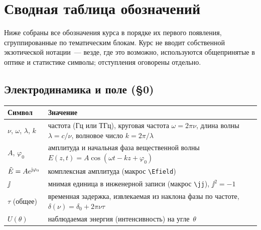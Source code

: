 %
\section{Сводная таблица обозначений}
\label{sec:notation}

Ниже собраны все обозначения курса в порядке их первого появления, сгруппированные по
тематическим блокам. Курс не вводит собственной экзотической нотации~--- везде, где это возможно,
используются общепринятые в оптике и статистике символы; отступления оговорены отдельно.

\subsection*{Электродинамика и поле (§0)}
\begin{center}
\footnotesize
\setlength{\tabcolsep}{6pt}
\begin{tabular}{@{}p{0.16\linewidth}p{0.84\linewidth}@{}}
\toprule
\textbf{Символ} & \textbf{Значение} \\
\midrule
$\nu$, $\omega$, $\lambda$, $k$ & частота (Гц или ТГц), круговая частота $\omega=2\pi\nu$, длина
волны $\lambda=c/\nu$, волновое число $k=2\pi/\lambda$ \\
$A$, $\varphi_0$ & амплитуда и начальная фаза вещественной волны $E(z,t)=A\cos(\omega t-kz+\varphi_0)$ \\
$\tilde{E}=A e^{\mathrm{j}\varphi_0}$ & комплексная амплитуда (макрос \texttt{\textbackslash Efield}) \\
$\jj$ & мнимая единица в инженерной записи (макрос \texttt{\textbackslash jj}), $\jj^2=-1$ \\
$\tau$ (общее) & временная задержка, извлекаемая из наклона фазы по частоте, $\delta(\nu)=\delta_0+2\pi\nu\tau$ \\
$U(\theta)$ & наблюдаемая энергия (интенсивность) на угле~$\theta$ \\
\bottomrule
\end{tabular}
\end{center}

